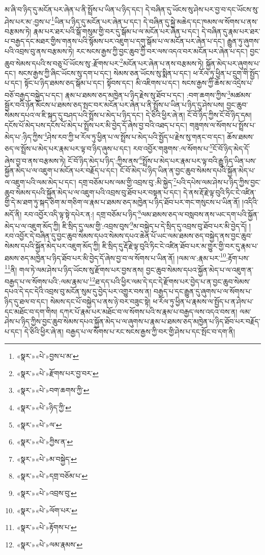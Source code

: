 མ་ཞི་བ་ཉིད་དུ་མངོན་པར་ཞེན་པ་ནི་སྤྲོས་པ་ཡིན་པ་ཉིད་དང་། དེ་བཞིན་དུ་ཡོངས་སུ་ཤེས་པར་བྱ་བ་དང་ཡོངས་སུ་ཤེས་པར་མ་:བྱས་པ་\footnote{«སྣར་»«པེ་»བྱས་པ་མ་}ཡིན་པ་ཉིད་དུ་མངོན་པར་ཞེན་པ་དང་། དེ་བཞིན་དུ་སྐྱེ་མཆེད་དང་ཁམས་ལ་སོགས་པ་ནས་བརྩམས་ཏེ། རྣམ་པར་ཐར་པའི་སྒོ་གསུམ་གྱི་བར་དུ་སྒོམ་པ་ལ་མངོན་པར་ཞེན་པ་དང་། དེ་བཞིན་དུ་རྣམ་པར་ཐར་པ་བརྒྱད་དང་མཐར་གྱིས་གནས་པའི་སྙོམས་པར་འཇུག་པ་དགུ་སྒོམ་པ་ལ་མངོན་པར་ཞེན་པ་དང་། རྒྱུན་ཏུ་ཞུགས་པའི་འབྲས་བུ་ནས་བརྩམས་ཏེ། རང་སངས་རྒྱས་ཀྱི་བྱང་ཆུབ་ཀྱི་བར་ལས་འདའ་བར་མངོན་པར་ཞེན་པ་དང་། བྱང་ཆུབ་སེམས་དཔའི་ས་བཅུ་པོ་ཡོངས་སུ་:རྫོགས་པར་\footnote{«སྣར་»«པེ་»རྫོགས་པར་བྱ་བར་}མངོན་པར་ཞེན་པ་ནས་བརྩམས་ཏེ། སྐྱོན་མེད་པར་ཞུགས་པ་དང་། སངས་རྒྱས་ཀྱི་ཞིང་ཡོངས་སུ་དག་པ་དང་། སེམས་ཅན་ཡོངས་སུ་སྨིན་པ་དང་། ཕ་རོལ་ཏུ་ཕྱིན་པ་དྲུག་གི་སྤྱོད་པ་དང་། སྟོང་པ་ཉིད་ཐམས་ཅད་སྒོམ་པ་དང་། སྟོབས་དང་། མི་འཇིགས་པ་དང་། སངས་རྒྱས་ཀྱི་ཆོས་མ་འདྲེས་པ་བཅོ་བརྒྱད་བསྐྱེད་པ་དང་། རྣམ་པ་ཐམས་ཅད་མཁྱེན་པ་ཉིད་རྗེས་སུ་ཐོབ་པ་དང་། :བག་ཆགས་ཀྱིས་\footnote{«སྣར་»«པེ་»བག་ཆགས་ཀྱི་}མཚམས་སྦྱོར་བའི་ཉོན་མོངས་པ་ཐམས་ཅད་སྤང་བར་མངོན་པར་ཞེན་པ་ནི་སྤྲོས་པ་ཡིན་པ་ཉིད་དུ་ཤེས་པས། བྱང་ཆུབ་སེམས་དཔའ་ལ་ཇི་སྐད་དུ་བཤད་པའི་སྤྲོས་པ་མེད་པ་ཉིད་དང་། དེ་ཅིའི་ཕྱིར་ཞེ་ན། ངོ་བོ་ཉིད་ཀྱིས་ངོ་བོ་ཉིད་དམ། དངོས་པོ་མེད་པས་དངོས་པོ་མེད་པ་སྤྲོས་པར་མི་བྱེད་དོ་ཞེས་བྱ་བའི་འཐད་པ་དང་། གཟུགས་ལ་སོགས་པ་སྤྲོས་པ་མེད་པ་:ཉིད་ཀྱིས་\footnote{«སྣར་»«པེ་»ཉིད་ཀྱི་}ཤེས་རབ་ཀྱི་ཕ་རོལ་ཏུ་ཕྱིན་པ་ལ་སྤྲོས་པ་མེད་པའི་སྤྱོད་པ་རྗེས་སུ་གནང་བ་དང་། ཆོས་ཐམས་ཅད་ལ་སྤྲོས་པ་མེད་པར་རྣམ་པར་ལྟ་བ་ཉིད་ཞུས་པ་དང་། རབ་འབྱོར་གཟུགས་:ལ་སོགས་པ་\footnote{«སྣར་»«པེ་»ལ་}ངོ་བོ་ཉིད་མེད་དོ་ཞེས་བྱ་བ་ནས་བརྩམས་ཏེ། ངོ་བོ་ཉིད་མེད་པ་ཉིད་:ཀྱིས་ནས་\footnote{«སྣར་»«པེ་»ཀྱིས་ན་}སྤྲོས་པ་མེད་པར་རྣམ་པར་ལྟ་བའི་རྒྱུ་ཉིད་ཡིན་པས་སྐྱོན་མེད་པ་ལ་འཇུག་པ་མངོན་པར་བརྗོད་པ་དང་། ངོ་བོ་མེད་པ་ཉིད་ཡིན་ན་བྱང་ཆུབ་སེམས་དཔའི་སྐྱོན་མེད་པ་ལ་འཇུག་པའི་ལམ་མེད་པ་དང་། དགྲ་བཅོམ་པས་ལམ་གྱི་འབྲས་བུ་:མི་སྐྱེད་\footnote{«སྣར་»«པེ་»མ་བསྐྱེད་}པའི་དཔེས་ལམ་ཤེས་པ་ཉིད་ཀྱིས་བྱང་ཆུབ་སེམས་དཔའི་སྐྱོན་མེད་པ་ལ་འཇུག་པའི་འབྲས་བུ་ཐོབ་པར་བསྟན་པ་དང་། དེ་ནས་རྡོ་རྗེ་ལྟ་བུའི་ཏིང་ངེ་འཛིན་གྱི་དེ་མ་ཐག་ཏུ་སྐད་ཅིག་མ་གཅིག་ལ་རྣམ་པ་ཐམས་ཅད་མཁྱེན་པ་ཉིད་ཐོབ་པར་གང་གསུངས་པ་ཡིན་ནོ། །འདིའི་མདོ་ནི། རབ་འབྱོར་འདི་ལྟ་སྟེ་དཔེར་ན:། དགྲ་བཅོམ་པ་ཉིད་\footnote{«སྣར་»«པེ་»དགྲ་བཅོམ་པ་}ལམ་ཐམས་ཅད་ལ་བསླབས་ནས་ཡང་དག་པའི་སྐྱོན་མེད་པ་ལ་འཇུག་མོད་ཀྱི། ཇི་སྲིད་དུ་ལམ་གྱི་:འབྲས་བུས་\footnote{«སྣར་»«པེ་»འབྲས་བུ་}མ་བསྐྱེད་པ་དེ་སྲིད་དུ་འབྲས་བུ་ཐོབ་པར་མི་བྱེད་དོ། །རབ་འབྱོར་དེ་བཞིན་དུ་བྱང་ཆུབ་སེམས་དཔའ་སེམས་དཔའ་ཆེན་པོ་ཡང་ལམ་ཐམས་ཅད་བསྐྱེད་ནས་བྱང་ཆུབ་སེམས་དཔའི་སྐྱོན་མེད་པར་འཇུག་མོད་ཀྱི། ཇི་སྲིད་དུ་རྡོ་རྗེ་ལྟ་བུའི་ཏིང་ངེ་འཛིན་ཐོབ་པར་མ་གྱུར་གྱི་བར་དུ་རྣམ་པ་ཐམས་ཅད་མཁྱེན་པ་ཉིད་ཐོབ་པར་མི་བྱེད་དོ་ཞེས་བྱ་བ་ལ་སོགས་པ་ཡིན་ནོ། །ལམ་ལ་:རྣམ་པར་\footnote{«སྣར་»«པེ་»ལོག་པར་}:རྟོག་པས་\footnote{«སྣར་»«པེ་»རྟོགས་པ་}ནི། གལ་ཏེ་ལམ་ཤེས་པ་ཉིད་ཡོངས་སུ་རྫོགས་པར་བྱས་ནས། བྱང་ཆུབ་སེམས་དཔའ་སྐྱོན་མེད་པ་ལ་འཇུག་ན་བརྒྱད་པ་ལ་སོགས་པའི་:ལམ་རྣམ་པ་\footnote{«སྣར་»«པེ་»ལམ་རྣམས་}ཐ་དད་པའི་ཕྱིར་ལམ་དེ་དང་དེ་རྫོགས་པར་བྱེད་པ་ན་བྱང་ཆུབ་སེམས་དཔའ་དེ་དང་དེའི་འབྲས་བུ་མངོན་སུམ་དུ་བྱེད་པར་འགྱུར་བས་ན། བརྒྱད་པ་དང་རྒྱུན་དུ་ཞུགས་པ་ལ་སོགས་པ་ཉིད་དུ་ཐལ་བ་དང་། སེམས་དང་པོ་བསྐྱེད་པ་ནས་ཉེ་བར་བཟུང་སྟེ། ཕ་རོལ་ཏུ་ཕྱིན་པ་རྣམས་ལ་སྤྱོད་པ་ན་ཤེས་པ་དང་མཐོང་བ་དག་གིས། དཀར་པོ་རྣམ་པར་མཐོང་བ་ལ་སོགས་པའི་ས་རྣམ་པ་བརྒྱད་ལས་འདའ་བས་ན། ལམ་ཤེས་པ་ཉིད་ཀྱིས་བྱང་ཆུབ་སེམས་དཔའ་སྐྱོན་མེད་པ་ལ་ཞུགས་པ་རྣམ་པ་ཐམས་ཅད་མཁྱེན་པ་ཉིད་ཐོབ་པར་བརྗོད་པ་དང་། དེ་ཅིའི་ཕྱིར་ཞེ་ན། བརྒྱད་པ་ལ་སོགས་པ་རང་སངས་རྒྱས་ཀྱི་བར་གྱི་ཤེས་པ་དང་སྤོང་བ་དག་ནི། 